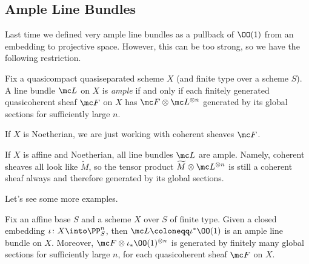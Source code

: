 \documentclass[../notes.tex]{subfiles}
\begin{document}
\subsection{Ample Line Bundles}
Last time we defined very ample line bundles as a pullback of $\OO(1)$ from an embedding to projective space. However, this can be too strong, so we have the following restriction.
\begin{definition}[Ample]
	Fix a quasicompact quasiseparated scheme $X$ (and finite type over a scheme $S$). A line bundle $\mc L$ on $X$ is \textit{ample} if and only if each finitely generated quasicoherent sheaf $\mc F$ on $X$ has $\mc F\otimes\mc L^{\otimes n}$ generated by its global sections for sufficiently large $n$.
\end{definition}
\begin{remark}
	If $X$ is Noetherian, we are just working with coherent sheaves $\mc F$.
\end{remark}
\begin{example}
	If $X$ is affine and Noetherian, all line bundles $\mc L$ are ample. Namely, coherent sheaves all look like $\widetilde M$, so the tensor product $\widetilde M\otimes\mc L^{\otimes n}$ is still a coherent sheaf always and therefore generated by its global sections.
\end{example}
Let's see some more examples.
\begin{theorem}[Serre] \label{thm:ample-on-pn}
	Fix an affine base $S$ and a scheme $X$ over $S$ of finite type. Given a closed embedding $\iota\colon X\into\PP^n_S$, then $\mc L\coloneqq\iota^*\OO(1)$ is an ample line bundle on $X$. Moreover, $\mc F\otimes\iota_*\OO(1)^{\otimes n}$ is generated by finitely many global sections for sufficiently large $n$, for each quasicoherent sheaf $\mc F$ on $X$.
\end{theorem}
\end{document}
